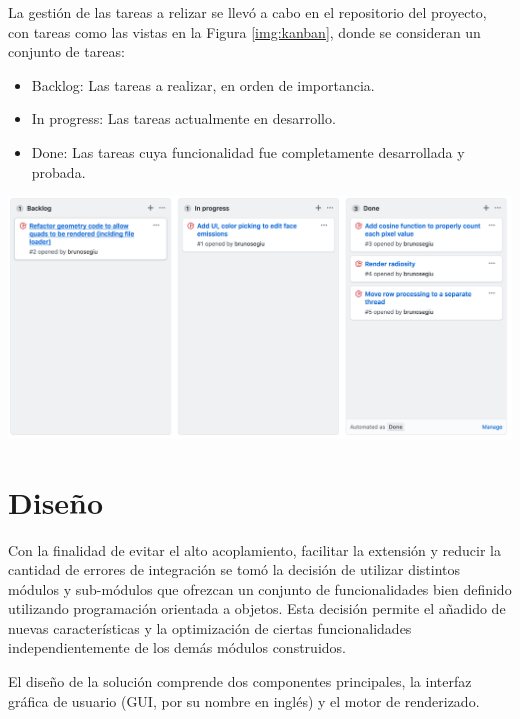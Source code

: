 La gestión de las tareas a relizar se llevó a cabo en el repositorio del proyecto, con tareas como las vistas en la Figura \ref{img:kanban}, donde se consideran un conjunto de tareas:

\begin{itemize}
	\item Backlog: Las tareas a realizar, en orden de importancia.
	\item In progress: Las tareas actualmente en desarrollo.
	\item Done: Las tareas cuya funcionalidad fue completamente desarrollada y probada.
\end{itemize}

\vspace{5mm}
\begin{minipage}[h]{0.8\linewidth}
	\centering
	\includegraphics[width=\linewidth]{assets/kanban}
	\label{img:kanban}
\end{minipage}

\section{Diseño}
\label{sec:disenio}

Con la finalidad de evitar el alto acoplamiento, facilitar la extensión y reducir la cantidad de errores de integración se tomó la decisión de utilizar distintos módulos y sub-módulos que ofrezcan un conjunto de funcionalidades bien definido utilizando programación orientada a objetos. Esta decisión permite el añadido de nuevas características y la optimización de ciertas funcionalidades independientemente de los demás módulos construidos.

El diseño de la solución comprende dos componentes principales, la interfaz gráfica de usuario (GUI, por su nombre en inglés) y el motor de renderizado.


